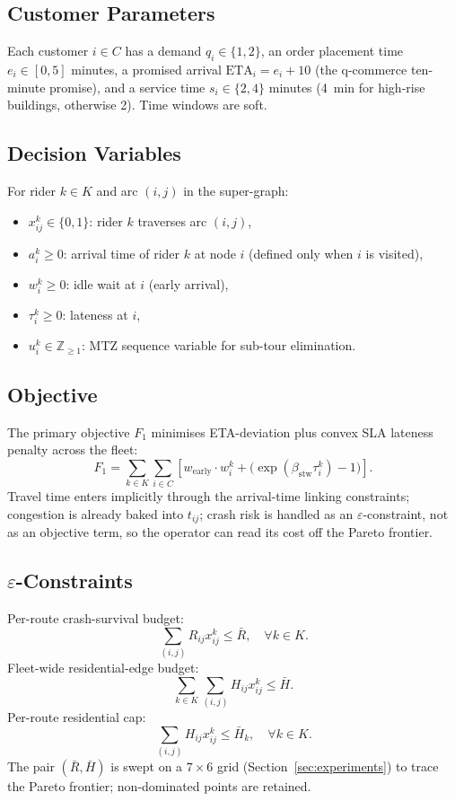 \documentclass{ieeeaccess}
\begin{document}
\subsection{Customer Parameters}
Each customer $i \in C$ has a demand $q_i \in \{1, 2\}$, an order
placement time $e_i \in [0, 5]$ minutes, a promised arrival
$\mathrm{ETA}_i = e_i + 10$ (the q-commerce ten-minute promise), and a
service time $s_i \in \{2, 4\}$ minutes (4~min for high-rise
buildings, otherwise 2). Time windows are soft.

\subsection{Decision Variables}
For rider $k \in K$ and arc $(i, j)$ in the super-graph:
\begin{itemize}
\item $x_{ij}^k \in \{0, 1\}$: rider $k$ traverses arc $(i, j)$,
\item $a_i^k \geq 0$: arrival time of rider $k$ at node $i$ (defined only when $i$ is visited),
\item $w_i^k \geq 0$: idle wait at $i$ (early arrival),
\item $\tau_i^k \geq 0$: lateness at $i$,
\item $u_i^k \in \mathbb{Z}_{\geq 1}$: MTZ sequence variable for sub-tour elimination.
\end{itemize}

\subsection{Objective}
The primary objective $F_1$ minimises ETA-deviation plus convex SLA
lateness penalty across the fleet:
\begin{equation}
F_1 = \sum_{k \in K} \sum_{i \in C}
\left[ w_{\text{early}} \cdot w_i^k + \big(\exp(\beta_{\text{stw}} \tau_i^k) - 1\big) \right].
\label{eq:F1}
\end{equation}
Travel time enters implicitly through the arrival-time linking
constraints; congestion is already baked into $t_{ij}$; crash risk is
handled as an $\varepsilon$-constraint, not as an objective term, so
the operator can read its cost off the Pareto frontier.

\subsection{$\varepsilon$-Constraints}
Per-route crash-survival budget:
\begin{equation}
\sum_{(i,j)} R_{ij} x_{ij}^k \leq \bar{R}, \quad \forall k \in K.
\label{eq:Rbar}
\end{equation}
Fleet-wide residential-edge budget:
\begin{equation}
\sum_{k \in K} \sum_{(i,j)} H_{ij} x_{ij}^k \leq \bar{H}.
\label{eq:Hbar}
\end{equation}
Per-route residential cap:
\begin{equation}
\sum_{(i,j)} H_{ij} x_{ij}^k \leq \bar{H}_k, \quad \forall k \in K.
\label{eq:Hk}
\end{equation}
The pair $(\bar{R}, \bar{H})$ is swept on a $7 \times 6$ grid
(Section~\ref{sec:experiments}) to trace the Pareto frontier; non-dominated
points are retained.
\end{document}
